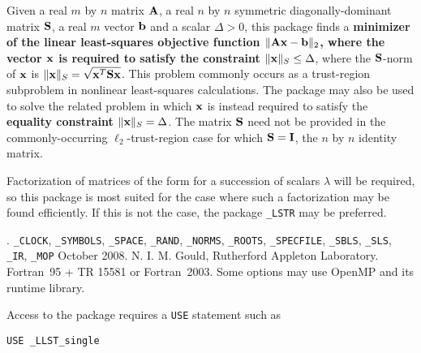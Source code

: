 \documentclass{galahad}
\newcommand{\packagename}{LLST}
\newcommand{\fullpackagename}{\libraryname\_\packagename}
\begin{document}
\galheader


\galsummary
Given a real $m$ by $n$ matrix ${\mathbf{A}}$,
a real $n$ by $n$ symmetric diagonally-dominant matrix ${\mathbf{S}}$,
a real $m$ vector ${\mathbf{b}}$ and a scalar $\Delta>0$, this package finds a
{\bf minimizer of the linear least-squares objective function
$\| {\mathbf{A}} {\mathbf{x}}  - {\mathbf{b}} \|_2$, where the vector ${\mathbf{x}}$ is
required to satisfy the constraint $\|{\mathbf{x}}\|_S \leq  \Delta$},
where the ${\mathbf{S}}$-norm of ${\mathbf{x}}$ is $\|{\mathbf{x}}\|_S = \sqrt{{\mathbf{x}}^T {\mathbf{S}} {\mathbf{x}}}$.
This problem commonly occurs as a trust-region subproblem in nonlinear
least-squares calculations.
The package may also be used to solve the related problem in which ${\mathbf{x}}$ is
instead required to satisfy the
{\bf equality constraint $\|{\mathbf{x}}\|_S = \Delta$}.
The matrix ${\mathbf{S}}$ need not be provided in the commonly-occurring
$\ell_2$-trust-region case for which ${\mathbf{S}} = {\mathbf{I}}$, the $n$ by $n$
identity matrix.

\noindent
Factorization of matrices of the form
for a succession
of scalars $\lambda$ will be required, so this package is most suited
for the case where such a factorization may be found efficiently. If
this is not the case, the package {\tt \libraryname\_LSTR} may be preferred.



\galattributes
\galversions{\tt  \fullpackagename\_single, \fullpackagename\_double}.
\galuses
{\tt \libraryname\_CLOCK},
{\tt \libraryname\_SY\-M\-BOLS},
{\tt \libraryname\_SPACE}, {\tt \libraryname\_\-RAND},
{\tt \libraryname\_\-NORMS},
{\tt \libraryname\_ROOTS}, {\tt \libraryname\_SPECFILE},
{\tt \libraryname\_SBLS},
{\tt \libraryname\_SLS}, {\tt \libraryname\_IR},
{\tt \libraryname\_MOP}
\galdate October 2008.
\galorigin N. I. M. Gould, Rutherford Appleton Laboratory.
\gallanguage Fortran~95 + TR 15581 or Fortran~2003.
\galparallelism Some options may use OpenMP and its runtime library.


\galhowto

Access to the package requires a {\tt USE} statement such as

\medskip{}

\hskip0.5in {\tt USE \fullpackagename\_single}
\end{document}
